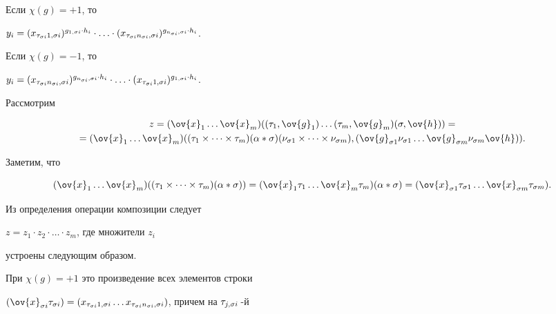 \begin{pf}
Если $\chi(g)=+1$, то


$y_i=(x_{\t_{\s{i}}1,\s{i}})^{g_{1,\s{i}}\cdot h_{i}} \cdot \dotsc \cdot


(x_{\t_{\s{i}}n_{\s{i}},\s{i}})^{{g_{n_{\s{i}},\s{i}}}\cdot h_{i}}$.


Если $\chi(g)=-1$, то


$y_i=


(x_{\t_{\s{i}}n_{\s{i}},\s{i}})^{{g_{n_{\s{i}},\s{i}}}\cdot h_{i}}


\cdot \dotsc \cdot


(x_{\t_{\s{i}}1,\s{i}})^{g_{1,\s{i}}\cdot h_{i}}$.








Рассмотрим


\begin{multline*}


z=(\ov{x}_1 \dotsc \ov{x}_m)((\t_1,\ov{g}_1)\dotsc(\t_m,\ov{g}_m)(\s,\ov{h}))=\\


=(\ov{x}_1 \dotsc \ov{x}_m) ((\t_1 \times \dotsb \times \t_m)(\al *\s)


(\nu_{\s1} \times \dotsb \times \nu_{\s{m}}),


(\ov{g}_{\s1}\nu_{\s1} \dotsc \ov{g}_{\s{m}}\nu_{\s{m}} \ov{h})).


\end{multline*}


Заметим, что


$$


(\ov{x}_1 \dotsc \ov{x}_m)((\t_1 \times \dotsb \times \t_m)(\al *\s))=


(\ov{x}_1\t_1 \dotsc \ov{x}_m \t_m)(\al *\s)=


(\ov{x}_{\s1}\t_{\s1} \dotsc \ov{x}_{\s{m}} \t_{\s{m}}).


$$





Из определения операции композиции следует


$z=z_1 \cdot z_2 \cdot \dotsc \cdot z_m$, где множители $z_i$


устроены следующим образом.


При $\chi(g)=+1$ это произведение всех элементов строки


$(\ov{x}_{\s{i}}\t_{\s{i}})=


(x_{\t_{\s{i}}1,\s{i}} \dotsc 


x_{\t_{\s{i}}n_{\s{i}},\s{i}})$, причем на $\t_{j,\s{i}}$\,-й



\end{pf}

